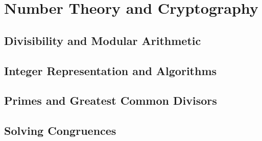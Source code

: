 \documentclass[../discrete.tex]{subfiles}
\begin{document}
\chapter{Number Theory and Cryptography}
\section{Divisibility and Modular Arithmetic}
\section{Integer Representation and Algorithms}
\section{Primes and Greatest Common Divisors}
\section{Solving Congruences}
\end{document}
